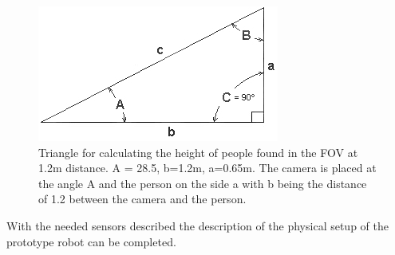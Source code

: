 \begin{figure}[H]
    \centering
    \includegraphics[width=.75\textwidth]{figures/Triangle.png}
    \caption{Triangle for calculating the height of people found in the FOV at 1.2m distance. A = 28.5\degree, b=1.2m, a=0.65m. The camera is placed at the angle A and the person on the side a with b being the distance of 1.2 between the camera and the person.}
    \label{fig:RealSenseAngle}
\end{figure}

With the needed sensors described the description of the physical setup of the prototype robot can be completed.
